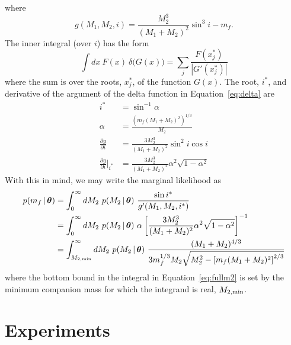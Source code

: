 \documentclass[apjl]{emulateapj}
\newcommand{\given}{\,|\,}
\newcommand{\bs}[1]{\boldsymbol{#1}}
\begin{document}
where
\begin{equation}
	g(M_1,M_2,i) = \frac{M_2^3}{(M_1+M_2)^2}\sin^3 i - m_f.
\end{equation}
The inner integral (over $i$) has the form
\begin{equation}
    \int dx~F(x)~\delta{(G(x)}) = \sum_j \frac{F(x^*_j)}{|G'(x^*_j)|}
\end{equation}
where the sum is over the roots, $x^*_j$, of the function $G(x)$. The root, $i^*$, and derivative of the argument of the delta function in Equation~\ref{eq:delta} are 
\begin{align}
	i^* &= \sin^{-1}\alpha\\
	\alpha &= \frac{(m_f(M_1+M_2)^2)^{1/3}}{M_2}\\
	\frac{\partial g}{\partial i} &= \frac{3M_2^3}{(M_1+M_2)^2}\sin^2 i \cos i\\
	\frac{\partial g}{\partial i}\bigg\rvert_{i^*} &= \frac{3M_2^3}{(M_1+M_2)^2} \alpha^2 \sqrt{1 - \alpha^2}
\end{align}
With this in mind, we may write the marginal likelihood as
\begin{align}
	p(m_f \given \bs{\theta}) &= \int_{0}^\infty dM_2~p(M_2 \given \bs{\theta})~\frac{\sin i^*}{g'(M_1,M_2,i^*)}\\
	&= \int_{0}^\infty dM_2~p(M_2 \given \bs{\theta})~\alpha\left[\frac{3M_2^3}{(M_1+M_2)^2} \alpha^2 \sqrt{1 - \alpha^2}\right]^{-1}\\
	&= \int_{M_{2,{\rm min}}}^\infty dM_2~p(M_2 \given \bs{\theta})~\frac{(M_1+M_2)^{4/3}}{3m_f^{1/3}M_2\sqrt{M_2^2 - \left[ m_f(M_1+M_2)^2 \right]^{2/3}}}\label{eq:fullm2}
\end{align}
where the bottom bound in the integral in Equation~\ref{eq:fullm2} is set by the minimum companion mass for which the integrand is real, $M_{2,{\rm min}}$.

\section{Experiments} \label{sec:experiments}
\end{document}

